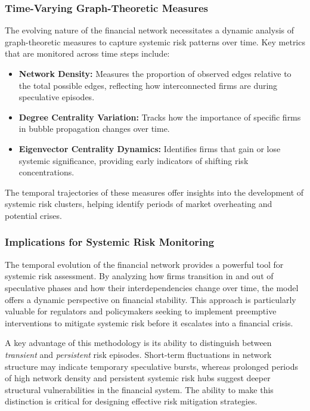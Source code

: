\documentclass[preprint,12pt,authoryear]{elsarticle}
\begin{document}
\subsubsection{Time-Varying Graph-Theoretic Measures}  

The evolving nature of the financial network necessitates a dynamic analysis of graph-theoretic measures to capture systemic risk patterns over time. Key metrics that are monitored across time steps include:

\begin{itemize}
    \item \textbf{Network Density:} Measures the proportion of observed edges relative to the total possible edges, reflecting how interconnected firms are during speculative episodes.
    \item \textbf{Degree Centrality Variation:} Tracks how the importance of specific firms in bubble propagation changes over time.
    \item \textbf{Eigenvector Centrality Dynamics:} Identifies firms that gain or lose systemic significance, providing early indicators of shifting risk concentrations.
\end{itemize}

The temporal trajectories of these measures offer insights into the development of systemic risk clusters, helping identify periods of market overheating and potential crises.

\subsubsection{Implications for Systemic Risk Monitoring}  

The temporal evolution of the financial network provides a powerful tool for systemic risk assessment. By analyzing how firms transition in and out of speculative phases and how their interdependencies change over time, the model offers a dynamic perspective on financial stability. This approach is particularly valuable for regulators and policymakers seeking to implement preemptive interventions to mitigate systemic risk before it escalates into a financial crisis.

A key advantage of this methodology is its ability to distinguish between \textit{transient} and \textit{persistent} risk episodes. Short-term fluctuations in network structure may indicate temporary speculative bursts, whereas prolonged periods of high network density and persistent systemic risk hubs suggest deeper structural vulnerabilities in the financial system. The ability to make this distinction is critical for designing effective risk mitigation strategies.
\end{document}
